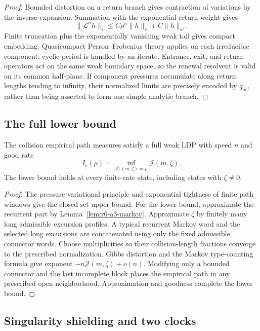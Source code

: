 \begin{proof}
Bounded distortion on a return branch gives contraction of variations by the
inverse expansion.  Summation with the exponential return weight gives
\[
\|\mathcal L^nh\|_s\le C\rho^n\|h\|_s+C\|h\|_w.
\]
Finite truncation plus the exponentially vanishing weak tail gives compact
embedding.  Quasicompact Perron--Frobenius theory applies on each irreducible
component; cyclic period is handled by an iterate.  Entrance, exit, and return
operators act on the same weak boundary space, so the renewal resolvent is
valid on its common half-plane.  If component pressures accumulate along
return lengths tending to infinity, their normalized limits are precisely
encoded by \(q_\infty\), rather than being asserted to form one simple
analytic branch.
\end{proof}

\subsection{The full lower bound}

\begin{theorem}
\label{thm:r6-a3-collision-ldp}
The collision empirical path measures satisfy a full weak LDP with speed
\(n\) and good rate
\[
I_c(\rho)=\inf_{\mathscr P_c(m,\zeta)=\rho}
\mathcal J(m,\zeta).
\]
The lower bound holds at every finite-rate state, including states with
\(\zeta\ne0\).
\end{theorem}

\begin{proof}
The pressure variational principle and exponential tightness of finite path
windows give the closed-set upper bound.  For the lower bound, approximate the
recurrent part by Lemma~\ref{lem:r6-a3-markov}.  Approximate \(\zeta\) by
finitely many long admissible excursion profiles.  A typical recurrent Markov
word and the selected long excursions are concatenated using only the fixed
admissible connector words.  Choose multiplicities so their collision-length
fractions converge to the prescribed normalization.  Gibbs distortion and
the Markov type-counting formula give exponent
\(-n\mathcal J(m,\zeta)+o(n)\).  Modifying only a bounded connector and the
last incomplete block places the empirical path in any prescribed open
neighborhood.  Approximation and goodness complete the lower bound.
\end{proof}

\subsection{Singularity shielding and two clocks}

